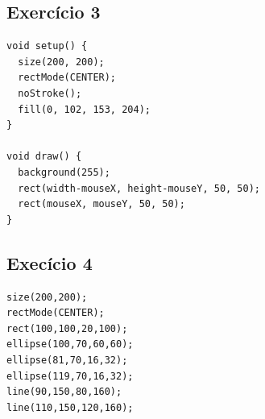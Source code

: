 \documentclass[12pt]{article}
\begin{document}
\subsection{Exercício 3}

\qquad \begin{verbatim}
void setup() {
  size(200, 200);
  rectMode(CENTER);
  noStroke();
  fill(0, 102, 153, 204);
}

void draw() {
  background(255);
  rect(width-mouseX, height-mouseY, 50, 50);
  rect(mouseX, mouseY, 50, 50);
}
\end{verbatim}

\subsection{Execício 4}

\begin{verbatim}
size(200,200);
rectMode(CENTER);
rect(100,100,20,100);
ellipse(100,70,60,60);
ellipse(81,70,16,32);
ellipse(119,70,16,32);
line(90,150,80,160);
line(110,150,120,160);
\end{verbatim}
\end{document}
